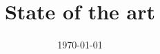 \title{\vspace{1.5cm}State of the art \\ \vspace{0.25cm} \LARGE{\textbf{\projecttitle}}}
\author{}
\date{\today}
